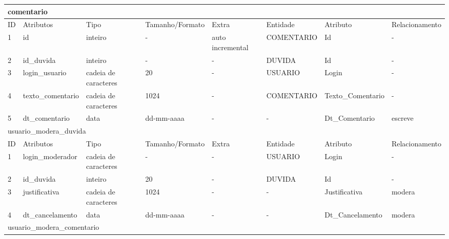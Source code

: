 \documentclass[graduacao,brazil]{ThesisPUC}
\begin{document}
\begin{table}[H]
{\begin{tabular}{|l|l|l|l|l|l|l|l|}
    \multicolumn{8}{|l|}{comentario} \\ \hline
    ID                        & Atributos        & Tipo                 & Tamanho/Formato & Extra            & Entidade        & Atributo         & Relacionamento  \\ \hline
    1                         & id               & inteiro              & -               & auto incremental & COMENTARIO      & Id               & -               \\ \hline
    2                         & id\_duvida       & inteiro              & -               & -                & DUVIDA          & Id               & -               \\ \hline
    3                         & login\_usuario   & cadeia de caracteres & 20              & -                & USUARIO         & Login            & -               \\ \hline
    4                         & texto\_comentario & cadeia de caracteres & 1024            & -                & COMENTARIO      & Texto\_Comentario & -               \\ \hline
    5                         & dt\_comentario   & data                 & dd-mm-aaaa      & -                & -               & Dt\_Comentario   & escreve         \\ \hline
    \multicolumn{8}{|l|}{usuario\_modera\_duvida} \\ \hline
    ID                        & Atributos        & Tipo                 & Tamanho/Formato & Extra            & Entidade        & Atributo         & Relacionamento  \\ \hline
    1                         & login\_moderador & cadeia de caracteres & -               & -                & USUARIO         & Login            & -               \\ \hline
    2                         & id\_duvida       & inteiro              & 20              & -                & DUVIDA          & Id               & -               \\ \hline
    3                         & justificativa    & cadeia de caracteres & 1024            & -                & -               & Justificativa    & modera          \\ \hline
    4                         & dt\_cancelamento & data                 & dd-mm-aaaa      & -                & -               & Dt\_Cancelamento & modera          \\ \hline
    \multicolumn{8}{|l|}{usuario\_modera\_comentario} \\ \hline

\end{tabular}}
\end{table}
\end{document}
